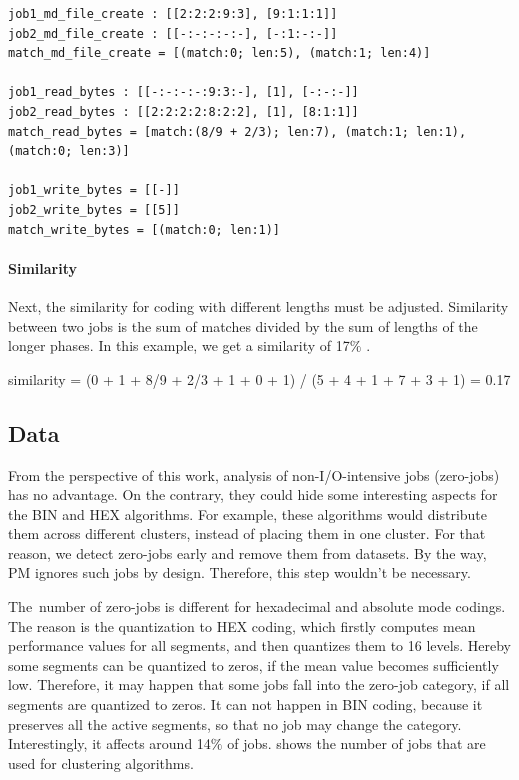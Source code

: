 \documentclass[]{llncs}
\begin{document}
\begin{lstlisting}
job1_md_file_create : [[2:2:2:9:3], [9:1:1:1]]
job2_md_file_create : [[-:-:-:-:-], [-:1:-:-]]
match_md_file_create = [(match:0; len:5), (match:1; len:4)]
 
job1_read_bytes : [[-:-:-:-:9:3:-], [1], [-:-:-]]
job2_read_bytes : [[2:2:2:2:8:2:2], [1], [8:1:1]]
match_read_bytes = [match:(8/9 + 2/3); len:7), (match:1; len:1), (match:0; len:3)]

job1_write_bytes = [[-]]
job2_write_bytes = [[5]]
match_write_bytes = [(match:0; len:1)]
\end{lstlisting}

\paragraph{Similarity}

Next, the similarity for coding with different lengths must be adjusted. Similarity between two jobs is the sum of matches divided by the sum of lengths of the longer phases. In this example, we get a similarity of 17$\%$ .

similarity = (0 + 1 + 8/9 + 2/3 + 1 + 0 + 1) / (5 + 4 + 1 + 7 + 3 + 1) = 0.17

\subsection{Data}
From the perspective of this work, analysis of non-I/O-intensive jobs (zero-jobs) has no advantage.
On the contrary, they could hide some interesting aspects for the BIN and HEX algorithms.
For example, these algorithms would distribute them across different clusters, instead of placing them in one cluster.
For that reason, we detect zero-jobs early and remove them from datasets.
By the way, PM ignores such jobs by design.
Therefore, this step wouldn’t be necessary.

The\ number of zero-jobs is different for hexadecimal and absolute mode codings.
The reason is the quantization to HEX coding, which firstly computes mean performance values for all segments, and then quantizes them to 16 levels.
Hereby some segments can be quantized to zeros, if the mean value becomes sufficiently low.
Therefore, it may happen that some jobs fall into the zero-job category, if all segments are quantized to zeros.
 It can not happen in BIN coding, because it preserves all the active segments, so that no job may change the category.
Interestingly, it affects around 14$\%$  of jobs.
 shows the number of jobs that are used for clustering algorithms.
\end{document}
